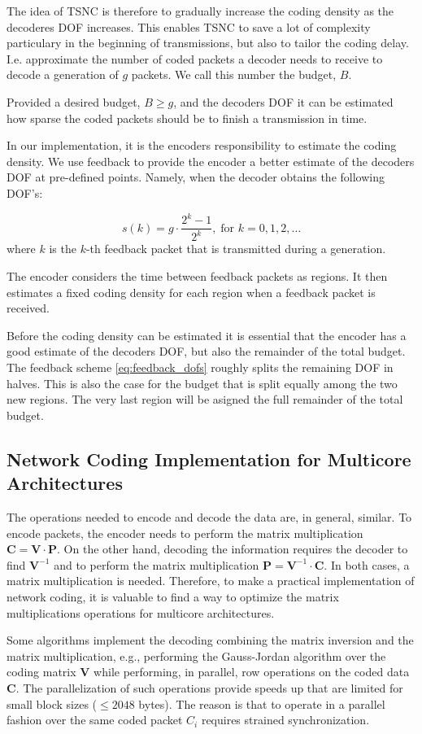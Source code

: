 The idea of \ac{TSNC} is therefore to gradually increase the coding density
as the decoderes \ac{DOF} increases. This enables TSNC to save a lot of
complexity particulary in the beginning of transmissions, but also to
tailor the coding delay. I.e. approximate the number of coded packets a
decoder needs to receive to decode a generation of $g$ packets. We call
this number the budget, $B$.

Provided a desired budget, $B \geq g$, and the decoders \ac{DOF} it can be
estimated how sparse the coded packets should be to finish a transmission in
time.

In our implementation, it is the encoders responsibility to estimate the coding
density. We use feedback to provide the encoder a better estimate of the
decoders \ac{DOF} at pre-defined points. Namely, when the decoder obtains the
following \ac{DOF}'s:

\begin{equation}\label{eq:feedback_dofs}
    s(k) = g\cdot \frac{2^k -1}{2^k},  \; \text{for } k=0,1,2,\dots
\end{equation}
where $k$ is the $k$-th feedback packet that is transmitted during a generation.

The encoder considers the time between feedback packets as regions. It then
estimates a fixed coding density for each region when a feedback packet is
received.

Before the coding density can be estimated it is essential that the encoder
has a good estimate of the decoders \ac{DOF}, but also the remainder of the
total budget. The feedback scheme \ref{eq:feedback_dofs} roughly splits the
remaining \ac{DOF} in halves. This is also the case for the budget that is
split equally among the two new regions. The very last region will be asigned
the full remainder of the total budget.

\subsection{Network Coding Implementation for Multicore Architectures}
\label{sub:implementation-multicore}

The operations needed to encode and decode the data are, in general, similar. To
encode packets, the encoder needs to perform the matrix multiplication
$\textbf{C} = \textbf{V} \cdot \textbf{P}$. On the other hand, decoding the
information requires the decoder to find $\textbf{V}^{-1}$ and to perform the
matrix multiplication $\textbf{P} = \textbf{V}^{-1} \cdot \textbf{C}$. In both
cases, a matrix multiplication is needed. Therefore, to make a practical
implementation of network coding, it is valuable to find a way to optimize the
matrix multiplications operations for multicore architectures.

Some algorithms implement the decoding combining the matrix inversion and the
matrix multiplication, e.g., performing the Gauss-Jordan algorithm over the
coding matrix $\textbf{V}$ while performing, in parallel, row operations on the
coded data $\textbf{C}$. The parallelization of such operations provide speeds
up that are limited for small block sizes ($\leq 2048$ bytes). The reason is
that to operate in a parallel fashion over the same coded packet $C_i$ requires
strained synchronization.
